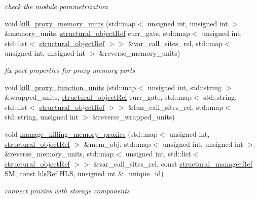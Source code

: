 \begin{DoxyCompactItemize}
\begin{DoxyCompactList}\small\item\em check the module parametrization \end{DoxyCompactList}\item 
void \hyperlink{classfu__binding_a2095e3ec75e968aeaffab65eab0ca654}{kill\+\_\+proxy\+\_\+memory\+\_\+units} (std\+::map$<$ unsigned int, unsigned int $>$ \&memory\+\_\+units, \hyperlink{structural__objects_8hpp_a8ea5f8cc50ab8f4c31e2751074ff60b2}{structural\+\_\+object\+Ref} curr\+\_\+gate, std\+::map$<$ unsigned int, std\+::list$<$ \hyperlink{structural__objects_8hpp_a8ea5f8cc50ab8f4c31e2751074ff60b2}{structural\+\_\+object\+Ref} $>$$>$ \&var\+\_\+call\+\_\+sites\+\_\+rel, std\+::map$<$ unsigned int, unsigned int $>$ \&reverse\+\_\+memory\+\_\+units)
\begin{DoxyCompactList}\small\item\em fix port properties for proxy memory ports \end{DoxyCompactList}\item 
void \hyperlink{classfu__binding_a0c1d997736c70885bf9fcd71ac1c5a16}{kill\+\_\+proxy\+\_\+function\+\_\+units} (std\+::map$<$ unsigned int, std\+::string $>$ \&wrapped\+\_\+units, \hyperlink{structural__objects_8hpp_a8ea5f8cc50ab8f4c31e2751074ff60b2}{structural\+\_\+object\+Ref} curr\+\_\+gate, std\+::map$<$ std\+::string, std\+::list$<$ \hyperlink{structural__objects_8hpp_a8ea5f8cc50ab8f4c31e2751074ff60b2}{structural\+\_\+object\+Ref} $>$$>$ \&fun\+\_\+call\+\_\+sites\+\_\+rel, std\+::map$<$ std\+::string, unsigned int $>$ \&reverse\+\_\+wrapped\+\_\+units)
\item 
void \hyperlink{classfu__binding_aec6b4a61983de5cd4ccb62fa937a67c4}{manage\+\_\+killing\+\_\+memory\+\_\+proxies} (std\+::map$<$ unsigned int, \hyperlink{structural__objects_8hpp_a8ea5f8cc50ab8f4c31e2751074ff60b2}{structural\+\_\+object\+Ref} $>$ \&mem\+\_\+obj, std\+::map$<$ unsigned int, unsigned int $>$ \&reverse\+\_\+memory\+\_\+units, std\+::map$<$ unsigned int, std\+::list$<$ \hyperlink{structural__objects_8hpp_a8ea5f8cc50ab8f4c31e2751074ff60b2}{structural\+\_\+object\+Ref} $>$$>$ \&var\+\_\+call\+\_\+sites\+\_\+rel, const \hyperlink{structural__manager_8hpp_ab3136f0e785d8535f8d252a7b53db5b5}{structural\+\_\+manager\+Ref} SM, const \hyperlink{hls_8hpp_a75d0c73923d0ddfa28c4843a802c73a7}{hls\+Ref} H\+LS, unsigned int \&\+\_\+unique\+\_\+id)
\begin{DoxyCompactList}\small\item\em connect proxies with storage components \end{DoxyCompactList}\item 
$$
\end{DoxyCompactItemize}
